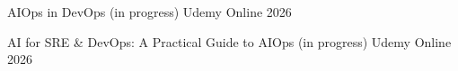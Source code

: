 
\begin{cvhonors}
  \cvhonor
    {AIOps in DevOps (in progress)} %
    {Udemy} %
    {Online} %
    {2026} %

  \cvhonor
    {AI for SRE \& DevOps: A Practical Guide to AIOps (in progress)} %
    {Udemy} %
    {Online} %
    {2026} %

\end{cvhonors}
